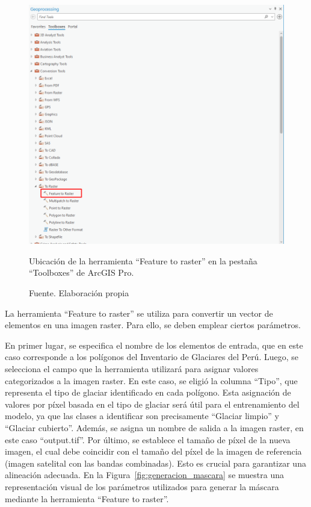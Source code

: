 \documentclass[12pt]{report}
\begin{document}
\begin{figure}[H]
   \centering 
   \includegraphics[width=1\textwidth]{Images/geoprocessing.png}
   \caption{Ubicación de la herramienta “Feature to raster” en la pestaña “Toolboxes” de ArcGIS Pro.}
   \caption*{Fuente. Elaboración propia}
   \label{fig:geoprocessing}
\end{figure} 

La herramienta “Feature to raster” se utiliza para convertir un vector de elementos en una imagen raster. Para ello, se deben emplear ciertos parámetros.

En primer lugar, se especifica el nombre de los elementos de entrada, que en este caso corresponde a los polígonos del Inventario de Glaciares del Perú. Luego, se selecciona el campo que la herramienta utilizará para asignar valores categorizados a la imagen raster. En este caso, se eligió la columna “Tipo”, que representa el tipo de glaciar identificado en cada polígono. Esta asignación de valores por píxel basada en el tipo de glaciar será útil para el entrenamiento del modelo, ya que las clases a identificar son precisamente “Glaciar limpio” y “Glaciar cubierto”. Además, se asigna un nombre de salida a la imagen raster, en este caso “output.tif”. Por último, se establece el tamaño de píxel de la nueva imagen, el cual debe coincidir con el tamaño del píxel de la imagen de referencia (imagen satelital con las bandas combinadas). Esto es crucial para garantizar una alineación adecuada. En la Figura~\ref{fig:generacion_mascara} se muestra una representación visual de los parámetros utilizados para generar la máscara mediante la herramienta “Feature to raster”.
\end{document}

